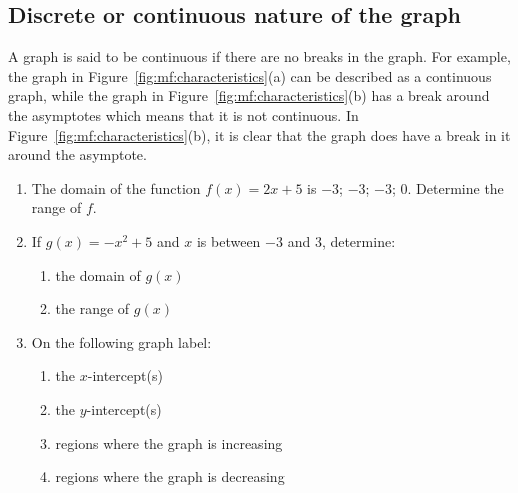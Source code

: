 \subsection*{Discrete or continuous nature of the graph}
\nopagebreak
A graph is said to be continuous if there are no breaks in the graph. For example, the graph in Figure~\ref{fig:mf:characteristics}(a) can be described as a continuous graph, while the graph in Figure~\ref{fig:mf:characteristics}(b) has a break around the asymptotes which means that it is not continuous.
In Figure~\ref{fig:mf:characteristics}(b), it is clear that the graph does have a break in it around the asymptote.\par 


\begin{exercises}{}
{
\begin{enumerate}[noitemsep, label=\textbf{\arabic*}. ] 
\item The domain of the function $f(x)=2x+5$ is $-3$; $-3$; $-3$; $0$. Determine the range of $f$.
\item If $g(x)=-{x}^{2}+5$ and $x$ is between $-3$ and $3$, determine:
    \begin{enumerate}[noitemsep, label=\textbf{\alph*}. ] 
    \item the domain of $g(x)$
    \item the range of $g(x)$
    \end{enumerate}
\item On the following graph label:
    \begin{enumerate}[noitemsep, label=\textbf{\alph*}. ] 
    \item the $x$-intercept(s)
    \item the $y$-intercept(s)
    \item regions where the graph is increasing
    \item regions where the graph is decreasing
    \end{enumerate}

\setcounter{subfigure}{0}
\begin{figure}[H] %
\begin{center}
\end{center}
\end{figure}               


\end{enumerate}}
\end{exercises}
